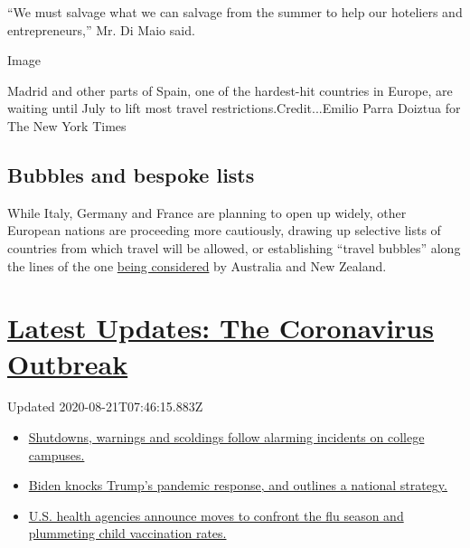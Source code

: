 ``We must salvage what we can salvage from the summer to help our
hoteliers and entrepreneurs,'' Mr. Di Maio said.

Image

Madrid and other parts of Spain, one of the hardest-hit countries in
Europe, are waiting until July to lift most travel
restrictions.Credit...Emilio Parra Doiztua for The New York Times

\hypertarget{bubbles-and-bespoke-lists}{%
\subsection{Bubbles and bespoke lists}\label{bubbles-and-bespoke-lists}}

While Italy, Germany and France are planning to open up widely, other
European nations are proceeding more cautiously, drawing up selective
lists of countries from which travel will be allowed, or establishing
``travel bubbles'' along the lines of the one
\href{https://www.nytimes3xbfgragh.onion/reuters/2020/05/27/world/asia/27reuters-health-coronavirus-newzealand.html}{being
considered} by Australia and New Zealand.

\hypertarget{latest-updates-the-coronavirus-outbreak}{%
\section{\texorpdfstring{\href{https://www.nytimes3xbfgragh.onion/2020/08/20/world/coronavirus-covid.html?action=click\&pgtype=Article\&state=default\&region=MAIN_CONTENT_1\&context=storylines_live_updates}{Latest
Updates: The Coronavirus
Outbreak}}{Latest Updates: The Coronavirus Outbreak}}\label{latest-updates-the-coronavirus-outbreak}}

Updated 2020-08-21T07:46:15.883Z

\begin{itemize}
\tightlist
\item
  \href{https://www.nytimes3xbfgragh.onion/2020/08/20/world/coronavirus-covid.html?action=click\&pgtype=Article\&state=default\&region=MAIN_CONTENT_1\&context=storylines_live_updates\#link-68774d88}{Shutdowns,
  warnings and scoldings follow alarming incidents on college campuses.}
\item
  \href{https://www.nytimes3xbfgragh.onion/2020/08/20/world/coronavirus-covid.html?action=click\&pgtype=Article\&state=default\&region=MAIN_CONTENT_1\&context=storylines_live_updates\#link-26b58724}{Biden
  knocks Trump's pandemic response, and outlines a national strategy.}
\item
  \href{https://www.nytimes3xbfgragh.onion/2020/08/20/world/coronavirus-covid.html?action=click\&pgtype=Article\&state=default\&region=MAIN_CONTENT_1\&context=storylines_live_updates\#link-4e542da3}{U.S.
  health agencies announce moves to confront the flu season and
  plummeting child vaccination rates.}
\end{itemize}


